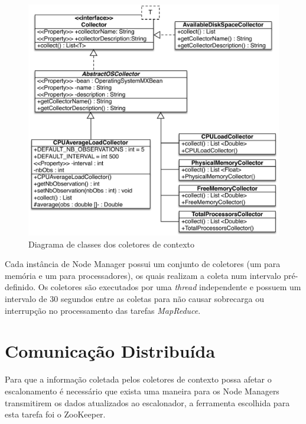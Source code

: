 \begin{figure}[!hbtn]
   \centering
   \includegraphics[width=15cm]{figuras/CollectorUML2.pdf}
   \caption{Diagrama de classes dos coletores de contexto}
   \label{fig:collectorUML}
\end{figure}

Cada instância de Node Manager possui um conjunto de coletores (um para memória e um para processadores), os quais realizam a coleta num intervalo pré-definido. Os coletores são executados por uma \textit{thread} independente e possuem um intervalo de 30 segundos entre as coletas para não causar sobrecarga ou interrupção no  processamento das tarefas \textit{MapReduce}.

%

\section{Comunicação Distribuída}
\label{sec:zookeeper}
Para que a informação coletada pelos coletores de contexto possa afetar o escalonamento é necessário que exista uma maneira para os Node Managers transmitirem os dados atualizados ao escalonador, a ferramenta escolhida para esta tarefa foi o ZooKeeper.

